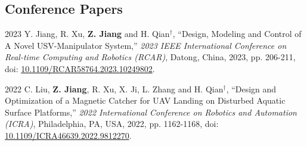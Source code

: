 \documentclass[11pt,letterpaper]{report}
\begin{document}
\subsection*{Conference Papers}
\begin{tablist}
%	
	
	\item[2023]   \tab{}Y. Jiang, R. Xu, \textbf{Z. Jiang} and H. Qian$^\dagger$, ``Design, Modeling and Control of A Novel USV-Manipulator System,'' \textit{2023 IEEE International Conference on Real-time Computing and Robotics (RCAR)}, Datong, China, 2023, pp. 206-211, doi: \href{https://doi.org/10.1109/RCAR58764.2023.10249802}{ 10.1109/RCAR58764.2023.10249802}.
		
	\item[2022]   \tab{}C. Liu, \textbf{Z. Jiang}, R. Xu, X. Ji, L. Zhang and H. Qian$^\dagger$, ``Design and Optimization of a Magnetic Catcher for UAV Landing on Disturbed Aquatic Surface Platforms,'' \textit{2022 International Conference on Robotics and Automation (ICRA)}, Philadelphia, PA, USA, 2022, pp. 1162-1168, doi: \href{https://doi.org/10.1109/ICRA46639.2022.9812270}{ 10.1109/ICRA46639.2022.9812270}.
\end{tablist}
	
\end{document}
